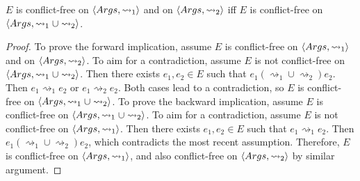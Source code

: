 \begin{lemma}
	\label{buildconflictfreeness}
	$E$ is conflict-free on $\langle{Args},{\rightsquigarrow_1}\rangle$ and on $\langle{Args},{\rightsquigarrow_2}\rangle$ iff $E$ is conflict-free on $\langle{Args},{\rightsquigarrow_1\cup\rightsquigarrow_2}\rangle$.	

	\begin{proof}
		To prove the forward implication, assume $E$ is conflict-free on $\langle{Args},{\rightsquigarrow_1}\rangle$ and on $\langle{Args},{\rightsquigarrow_2}\rangle$. To aim for a contradiction, assume $E$ is not conflict-free on $\langle{Args},{\rightsquigarrow_1\cup\rightsquigarrow_2}\rangle$. Then there exists $e_1,e_2\in E$ such that $e_1(\rightsquigarrow_1\cup\rightsquigarrow_2)e_2$. Then $e_1\rightsquigarrow_1 e_2$ or $e_1\rightsquigarrow_2 e_2$. Both cases lead to a contradiction, so $E$ is conflict-free on $\langle{Args},{\rightsquigarrow_1\cup\rightsquigarrow_2}\rangle$.
		\linespace
		To prove the backward implication, assume $E$ is conflict-free on $\langle{Args},{\rightsquigarrow_1\cup\rightsquigarrow_2}\rangle$. To aim for a contradiction, assume $E$ is not conflict-free on $\langle{Args},{\rightsquigarrow_1}\rangle$. Then there exists $e_1,e_2\in E$ such that $e_1\rightsquigarrow_1 e_2$. Then $e_1(\rightsquigarrow_1\cup\rightsquigarrow_2)e_2$, which contradicts the most recent assumption. Therefore, $E$ is conflict-free on $\langle{Args},{\rightsquigarrow_1}\rangle$, and also conflict-free on $\langle{Args},{\rightsquigarrow_2}\rangle$ by similar argument.
	\end{proof}
\end{lemma}

